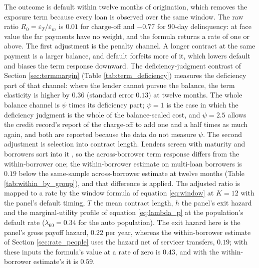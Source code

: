 The outcome is default within twelve months of origination, which removes the exposure term because every loan is observed over the same window. The raw ratio $R_0 = \varepsilon_T/\varepsilon_m$ is $0.01$ for charge-off and $-0.77$ for 90-day delinquency: at face value the far payments have no weight, and the formula returns a rate of one or above. The first adjustment is the penalty channel. A longer contract at the same payment is a larger balance, and default forfeits more of it, which lowers default and biases the term response downward. The deficiency-judgment contrast of Section \ref{sec:termmargin} (Table \ref{tab:term_deficiency}) measures the deficiency part of that channel: where the lender cannot pursue the balance, the term elasticity is higher by $0.36$ (standard error $0.13$) at twelve months. The whole balance channel is $\psi$ times its deficiency part; $\psi = 1$ is the case in which the deficiency judgment is the whole of the balance-scaled cost, and $\psi = 2.5$ allows the credit record's report of the charge-off to add one and a half times as much again, and both are reported because the data do not measure $\psi$. The second adjustment is selection into contract length. Lenders screen with maturity and borrowers sort into it \citep{hertzberg_screening_2018}, so the across-borrower term response differs from the within-borrower one; the within-borrower estimate on multi-loan borrowers is $0.19$ below the same-sample across-borrower estimate at twelve months (Table \ref{tab:within_by_group}), and that difference is applied. The adjusted ratio is mapped to a rate by the window formula of equation \eqref{eq:window} at $K = 12$ with the panel's default timing, $T$ the mean contract length, $h$ the panel's exit hazard and the marginal-utility profile of equation \eqref{eq:lambda_p} at the population's default rate ($\lambda_{60} = 0.34$ for the auto population). The exit hazard here is the panel's gross payoff hazard, $0.22$ per year, whereas the within-borrower estimate of Section \ref{sec:rate_people} uses the hazard net of servicer transfers, $0.19$; with these inputs the formula's value at a rate of zero is $0.43$, and with the within-borrower estimate's it is $0.59$.

